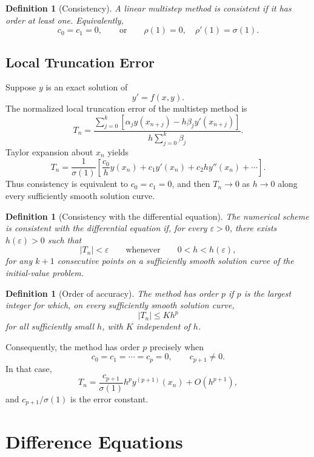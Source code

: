 \documentclass[11pt,a4paper]{article}
\numberwithin{equation}{section}
\theoremstyle{spacedplain}
\theoremstyle{spaceddefinition}
\newtheorem{definition}[theorem]{Definition}
\theoremstyle{spacedremark}
\begin{document}
\begin{definition}[Consistency]
A linear multistep method is consistent if it has order at least one.
Equivalently,
\[
  c_0=c_1=0,
  \qquad\text{or}\qquad
  \rho(1)=0,\quad \rho'(1)=\sigma(1).
\]
\end{definition}

\subsection{Local Truncation Error}

Suppose \(y\) is an exact solution of
\[
  y'=f(x,y).
\]
The normalized local truncation error of the multistep method is
\[
  T_n
  =\frac{
    \displaystyle\sum_{j=0}^{k}
    \left[\alpha_jy(x_{n+j})-h\beta_jy'(x_{n+j})\right]
  }{
    \displaystyle h\sum_{j=0}^{k}\beta_j
  }.
\]
Taylor expansion about \(x_n\) yields
\[
  T_n
  =\frac{1}{\sigma(1)}
   \left[
     \frac{c_0}{h}y(x_n)+c_1y'(x_n)
     +c_2hy''(x_n)+\cdots
   \right].
\]
Thus consistency is equivalent to \(c_0=c_1=0\), and then
\(T_n\to0\) as \(h\to0\) along every sufficiently smooth solution
curve.

\begin{definition}[Consistency with the differential equation]
The numerical scheme is consistent with the differential equation if,
for every \(\varepsilon>0\), there exists \(h(\varepsilon)>0\) such that
\[
  |T_n|<\varepsilon
  \qquad\text{whenever}\qquad 0<h<h(\varepsilon),
\]
for any \(k+1\) consecutive points on a sufficiently smooth solution
curve of the initial-value problem.
\end{definition}

\begin{definition}[Order of accuracy]
The method has order \(p\) if \(p\) is the largest integer for which,
on every sufficiently smooth solution curve,
\[
  |T_n|\leq Kh^p
\]
for all sufficiently small \(h\), with \(K\) independent of \(h\).
\end{definition}

Consequently, the method has order \(p\) precisely when
\[
  c_0=c_1=\cdots=c_p=0,
  \qquad c_{p+1}\neq0.
\]
In that case,
\[
  T_n
  =\frac{c_{p+1}}{\sigma(1)}
   h^p y^{(p+1)}(x_n)+O(h^{p+1}),
\]
and \(c_{p+1}/\sigma(1)\) is the error constant.

\section{Difference Equations}
\end{document}
